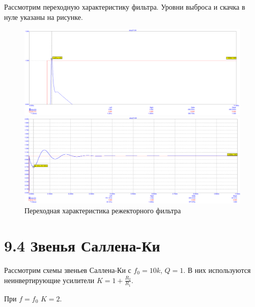 \documentclass[12pt,a4paper]{article}
\begin{document}
	Рассмотрим переходную характеристику фильтра.
	Уровни выброса и скачка в нуле указаны на рисунке.
	\begin{figure}[H]
		\centering
		\begin{minipage}[b]{.5\textwidth}
			\includegraphics[width=1\linewidth]{res/stop2T_first.png}
		\end{minipage}%
		\begin{minipage}[b]{.5\textwidth}
			\includegraphics[width=1\linewidth]{res/stop2T_peak.png}
		\end{minipage}
		\caption{Переходная характеристика режекторного фильтра}
	\end{figure}
	
	\section*{9.4 Звенья Саллена-Ки}
	
	Рассмотрим схемы звеньев Саллена-Ки с $f_0 = 10k$, $Q = 1$.
	В них используются неинвертирующие усилители $K = 1 + \frac{R_2}{R_1}$.

	При $f = f_0$ $K = 2$.
\end{document}
